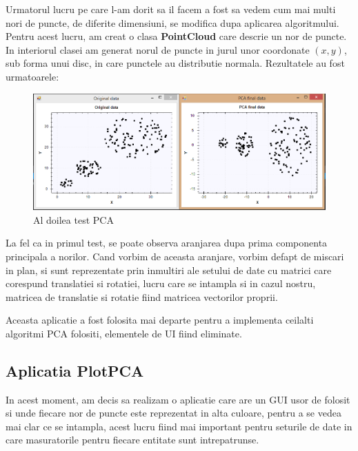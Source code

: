 \documentclass[12pt,oneside]{article}
\begin{document}
Urmatorul lucru pe care l-am dorit sa il facem a fost sa vedem cum mai multi nori de puncte, de diferite dimensiuni, se modifica dupa aplicarea algoritmului. Pentru acest lucru, am creat o clasa \textbf{PointCloud} care descrie un nor de puncte. In interiorul clasei am generat norul de puncte in jurul unor coordonate $\left(x,y\right)$, sub forma unui disc, in care punctele au distributie normala. Rezultatele au fost urmatoarele:

\begin{figure}[H]
\centering
\caption{Al doilea test PCA}
\includegraphics[width=\linewidth]{Test2}
\end{figure}

La fel ca in primul test, se poate observa aranjarea dupa prima componenta principala a norilor. Cand vorbim de aceasta aranjare, vorbim defapt de miscari in plan, si sunt reprezentate prin inmultiri ale setului de date cu matrici care corespund translatiei si rotatiei, lucru care se intampla si in cazul nostru, matricea de translatie si rotatie fiind matricea vectorilor proprii.

Aceasta aplicatie a fost folosita mai departe pentru a implementa ceilalti algoritmi PCA folositi, elementele de UI fiind eliminate.

\newpage
\subsection{Aplicatia PlotPCA}
In acest moment, am decis sa realizam o aplicatie care are un GUI usor de folosit si unde fiecare nor de puncte este reprezentat in alta culoare, pentru a se vedea mai clar ce se intampla, acest lucru fiind mai important pentru seturile de date in care masuratorile pentru fiecare entitate sunt intrepatrunse.
\end{document}
